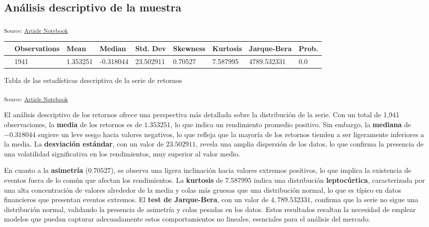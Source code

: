 \documentclass[
  number,
  preprint,
  3p,
  onecolumn]{elsarticle}
\begin{document}
\subsection{Análisis descriptivo de la
muestra}\label{sec-estadistica-descriptiva}

\textsubscript{Source:
\href{https://iancont.github.io/fixed_income_garch/index.qmd.html}{Article
Notebook}}

\begin{longtable}[]{@{}lllllllll@{}}
\toprule\noalign{}
& Observations & Mean & Median & Std. Dev & Skewness & Kurtosis &
Jarque-Bera & Prob. \\
\midrule\noalign{}
\endhead
\bottomrule\noalign{}
\endlastfoot
0 & 1941 & 1.353251 & -0.318044 & 23.502911 & 0.70527 & 7.587995 &
4789.532331 & 0.0 \\
\end{longtable}

Tabla de las estadísticas descriptiva de la serie de retornos

\textsubscript{Source:
\href{https://iancont.github.io/fixed_income_garch/index.qmd.html}{Article
Notebook}}

El análisis descriptivo de los retornos ofrece una perspectiva más
detallada sobre la distribución de la serie. Con un total de 1,941
observaciones, la \textbf{media} de los retornos es de \(1.353251\), lo
que indica un rendimiento promedio positivo. Sin embargo, la
\textbf{mediana} de \(-0.318044\) sugiere un leve sesgo hacia valores
negativos, lo que refleja que la mayoría de los retornos tienden a ser
ligeramente inferiores a la media. La \textbf{desviación estándar}, con
un valor de \(23.502911\), revela una amplia dispersión de los datos, lo
que confirma la presencia de una volatilidad significativa en los
rendimientos, muy superior al valor medio.

En cuanto a la \textbf{asimetría} (\(0.70527\)), se observa una ligera
inclinación hacia valores extremos positivos, lo que implica la
existencia de eventos fuera de lo común que afectan los rendimientos. La
\textbf{kurtosis} de \(7.587995\) indica una distribución
\textbf{leptocúrtica}, caracterizada por una alta concentración de
valores alrededor de la media y colas más gruesas que una distribución
normal, lo que es típico en datos financieros que presentan eventos
extremos. El \textbf{test de Jarque-Bera}, con un valor de
\(4,789.532331\), confirma que la serie no sigue una distribución
normal, validando la presencia de asimetría y colas pesadas en los
datos. Estos resultados resaltan la necesidad de emplear modelos que
puedan capturar adecuadamente estos comportamientos no lineales,
esenciales para el análisis del mercado.
\end{document}
